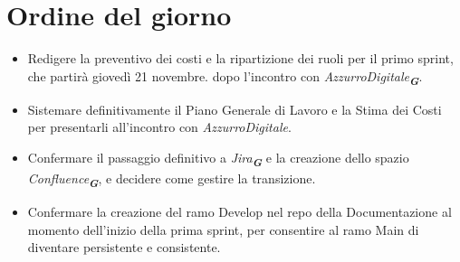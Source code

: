 

\section{Ordine del giorno}

\begin{itemize}
    \item Redigere la preventivo dei costi e la ripartizione dei ruoli per il primo sprint, che partirà giovedì 21 novembre. dopo l'incontro con 
    \emph{AzzurroDigitale}\textsubscript{\textit{\textbf{G}}}.
    \item Sistemare definitivamente il Piano Generale di Lavoro e la Stima dei Costi per presentarli all'incontro con \emph{AzzurroDigitale}.
    \item Confermare il passaggio definitivo a \emph{Jira}\textsubscript{\textit{\textbf{G}}} e la creazione dello spazio 
    \emph{Confluence}\textsubscript{\textit{\textbf{G}}}, e decidere come gestire la transizione.
    \item Confermare la creazione del ramo Develop nel repo della Documentazione al momento dell'inizio della prima sprint, per consentire al ramo
    Main di diventare persistente e consistente.
\end{itemize}